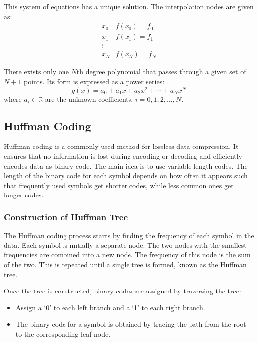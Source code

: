 This system of equations has a unique solution. The interpolation nodes are given as:
\begin{equation}
\begin{array}{ll}
x_0 & f(x_0) = f_0 \\
x_1 & f(x_1) = f_1 \\
\vdots & \\
x_N & f(x_N) = f_N
\end{array}
\end{equation}
 
There exists only one $N$th degree polynomial that passes through a given set of $N + 1$ points. Its form is expressed as a power series:
\begin{equation}
    g(x) = a_0 + a_1 x + a_2 x^2 + \cdots + a_N x^N
\end{equation}
where $a_i \in \mathbb{R}$ are the unknown coefficients, $i = 0, 1, 2, \ldots, N$.
 
\subsection{Huffman Coding}
 
Huffman coding is a commonly used method for lossless data compression. It ensures that no information is lost during encoding or decoding and efficiently encodes data as binary code. The main idea is to use variable-length codes. The length of the binary code for each symbol depends on how often it appears such that frequently used symbols get shorter codes, while less common ones get longer codes.
 
\subsubsection{Construction of Huffman Tree}
 
The Huffman coding process starts by finding the frequency of each symbol in the data. Each symbol is initially a separate node. The two nodes with the smallest frequencies are combined into a new node. The frequency of this node is the sum of the two. This is repeated until a single tree is formed, known as the Huffman tree.
 
Once the tree is constructed, binary codes are assigned by traversing the tree:
\begin{itemize}
    \item Assign a `0' to each left branch and a `1' to each right branch.
    \item The binary code for a symbol is obtained by tracing the path from the root to the corresponding leaf node.
\end{itemize}
 
